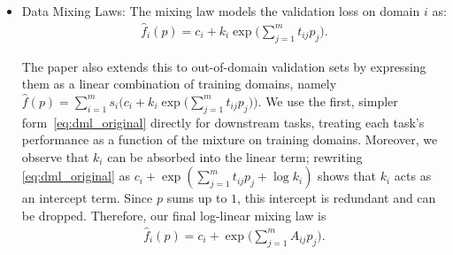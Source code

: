 \documentclass[table]{ai2style/ai2}
\begin{document}
\begin{itemize}
     \item Data Mixing Laws: The mixing law models the validation loss on domain $i$ as:
     \begin{align}
         \hat{f}_i(p) = c_i + k_i \exp\bigg(\sum_{j = 1}^m t_{ij} p_j\bigg).\label{eq:dml_original}
     \end{align}

     The paper also extends this to out-of-domain validation sets by expressing them as a linear combination of training domains, namely $\hat{f}(p) = \sum_{i = 1}^m s_i \Big(c_i + k_i \exp \big(\sum_{j = 1}^m t_{ij} p_j\big) \Big)$. We use the first, simpler form~\eqref{eq:dml_original} directly for downstream tasks, treating each task's performance as a function of the mixture on training domains. Moreover, we observe that $k_i$ can be absorbed into the linear term; rewriting \eqref{eq:dml_original} as $c_i + \exp(\sum_{j = 1}^m t_{ij} p_j + \log k_i)$ shows that $k_i$ acts as an intercept term.  Since $p$ sums up to $1$, this intercept is redundant and can be dropped. Therefore, our final log-linear mixing law is
     \begin{align}
         \hat{f}_i(p) = c_i + \exp\bigg(\sum_{j = 1}^m A_{ij} p_j\bigg). \label{eq:app_log_linear}
     \end{align}
     
    \end{itemize}
\end{document}
